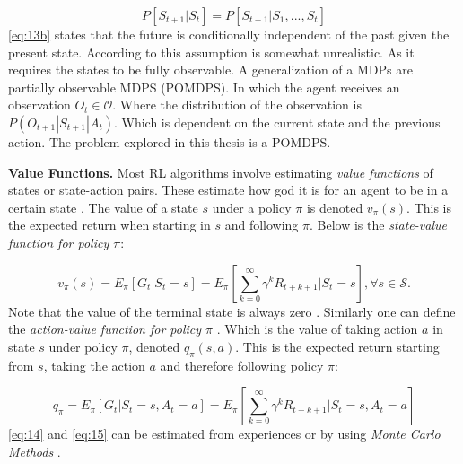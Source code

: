 \documentclass{kththesis}
\theoremstyle{definition}
\begin{document}
\begin{equation}
    \label{eq:13b}
    P[S_{t+1} | S_t] = P[S_{t+1} | S_1, ..., S_t]
\end{equation}
\autoref{eq:13b} states that the future is conditionally independent of the past given the present state. According to \textcite{arulkumaran2017brief} this assumption is somewhat unrealistic. As it requires the states to be fully observable. A generalization of a MDPs are partially observable MDPS (POMDPS). In which the agent receives an observation $O_t \in \mathcal{O}$. Where the distribution of the observation is $P(O_{t+1} | S_{t+1} | A_t)$\parencite{arulkumaran2017brief}. Which is dependent on the current state and the previous action. The problem explored in this thesis is a POMDPS.
\newline

\textbf{Value Functions.} Most RL algorithms involve estimating \textit{value functions} of states or state-action pairs. These estimate how god it is for an agent to be in a certain state \parencite{sutton1998reinforcement, li2017deep}. The value of a state $s$ under a policy $\pi$ is denoted $v_{\pi}(s)$. This is the expected return when starting in $s$ and following $\pi$. Below is the \textit{state-value function for policy $\pi$}:

\begin{equation}
    \label{eq:14}
    v_{\pi}(s) = E_{\pi}[G_t | S_t = s] = E_{\pi}\left[\sum_{k=0}^{\infty}{\gamma^{k}R_{t+k+1}} | S_t = s\right], \forall s \in \mathcal{S}.
\end{equation}
Note that the value of the terminal state is always zero \parencite{sutton1998reinforcement}. Similarly  one can define the \textit{action-value function for policy $\pi$} \parencite{sutton1998reinforcement}. Which is the value of taking action $a$ in state $s$ under policy $\pi$, denoted $q_{\pi}(s,a)$. This is the expected return starting from $s$, taking the action $a$ and therefore following policy $\pi$:

\begin{equation}
    \label{eq:15}
    q_{\pi} = E_{\pi}[G_t | S_t =s, A_t = a] = E_{\pi} \left[\sum_{k=0}^{\infty}{\gamma^{k}R_{t+k+1}} | S_t=s, A_t=a \right]
\end{equation}
\autoref{eq:14} and \autoref{eq:15} can be estimated from experiences or by using \textit{Monte Carlo Methods} \parencite{sutton1998reinforcement}.
\newline
\end{document}
